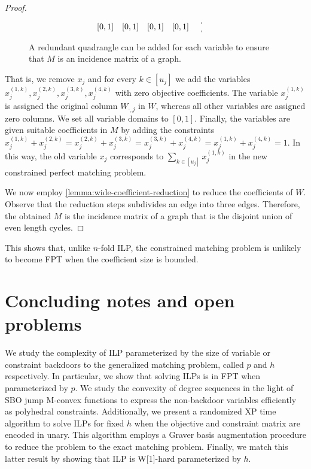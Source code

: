 \documentclass[a4paper,UKenglish,cleveref,thm-restate]{lipics-v2021}
\makeatletter
\newenvironment{cdisplaymath}{\@fleqnfalse\begin{displaymath}}{\end{displaymath}}
\makeatother
\begin{document}
\begin{proof}
\begin{figure}[H]
\begin{cdisplaymath}
\begin{array}{c c c c c:c l}
                [0,1]&[0,1]&[0,1]&[0,1]&&&
            \end{array}
        \end{cdisplaymath}
        \caption{A redundant quadrangle can be added for each variable to ensure that $M$ is an incidence matrix of a graph.}
        \label{fig:quadrangle}
    \end{figure}
    That is, we remove $x_j$ and for every $k\in[u_j]$ we add the variables $x_j^{(1,k)},x_j^{(2,k)},x_j^{(3,k)},x_j^{(4,k)}$ with zero objective coefficients. The variable $x_j^{(1,k)}$ is assigned the original column $W_{\cdot,j}$ in $W$, whereas all other variables are assigned zero columns. We set all variable domains to $[0,1]$. Finally, the variables are given suitable coefficients in $M$ by adding the constraints $x_j^{(1,k)}+x_j^{(2,k)}=x_j^{(2,k)}+x_j^{(3,k)}=x_j^{(3,k)}+x_j^{(4,k)}=x_j^{(1,k)}+x_j^{(4,k)}=1$. In this way, the old variable $x_j$ corresponds to $\sum_{k\in[u_j]}x_j^{(1,k)}$ in the new constrained perfect matching problem.
    
    We now employ \cref{lemma:wide-coefficient-reduction} to reduce the coefficients of $W$. Observe that the reduction steps subdivides an edge into three edges. Therefore, the obtained $M$ is the incidence matrix of a graph that is the disjoint union of even length cycles.
\end{proof}

This shows that, unlike $n$-fold ILP, the constrained matching problem is unlikely to become FPT when the coefficient size is bounded. 
\section{Concluding notes and open problems}
We study the complexity of ILP parameterized by the size of variable or constraint backdoors to the generalized matching problem, called $p$ and $h$ respectively. In particular, we show that solving ILPs is in FPT when parameterized by $p$. We study the convexity of degree sequences in the light of SBO jump M-convex functions to express the non-backdoor variables efficiently as polyhedral constraints. Additionally, we present a randomized XP time algorithm to solve ILPs for fixed $h$ when the objective and constraint matrix are encoded in unary. This algorithm employs a Graver basis augmentation procedure to reduce the problem to the exact matching problem. Finally, we match this latter result by showing that ILP is W[1]-hard parameterized by $h$.
\end{document}
